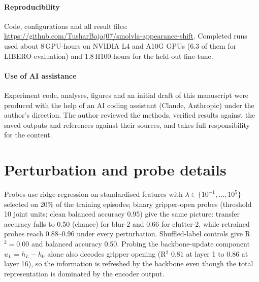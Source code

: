 \documentclass[conference]{IEEEtran}
\begin{document}
\paragraph{Reproducibility} Code, configurations and all result files: \url{https://github.com/TusharBajaj07/smolvla-appearance-shift}. Completed runs used about 8\,GPU-hours on NVIDIA L4 and A10G GPUs (6.3 of them for LIBERO evaluation) and 1.8\,H100-hours for the held-out fine-tune.

\paragraph{Use of AI assistance} Experiment code, analyses, figures and an initial draft of this manuscript were produced with the help of an AI coding assistant (Claude, Anthropic) under the author's direction. The author reviewed the methods, verified results against the saved outputs and references against their sources, and takes full responsibility for the content.




\appendix
\section{Perturbation and probe details}
Probes use ridge regression on standardised features with $\lambda \in \{10^{-1},\dots,10^5\}$ selected on 20\% of the training episodes; binary gripper-open probes (threshold 10 joint units; clean balanced accuracy 0.95) give the same picture: transfer accuracy falls to 0.50 (chance) for blur-2 and 0.66 for clutter-2, while retrained probes reach 0.88--0.96 under every perturbation. Shuffled-label controls give R$^2 = 0.00$ and balanced accuracy 0.50. Probing the backbone-update component $u_L = h_L - h_0$ alone also decodes gripper opening (R$^2$ 0.81 at layer 1 to 0.86 at layer 16), so the information is refreshed by the backbone even though the total representation is dominated by the encoder output.
\end{document}
